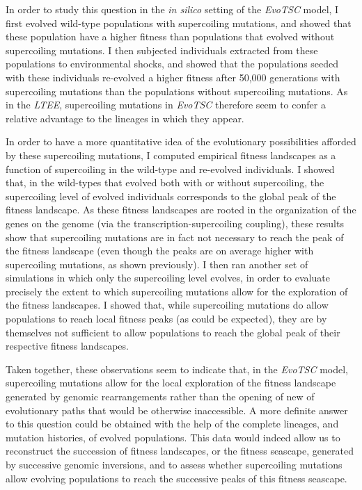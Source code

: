 In order to study this question in the \emph{in silico} setting of the \emph{EvoTSC} model, I first evolved wild-type populations with supercoiling mutations, and showed that these population have a higher fitness than populations that evolved without supercoiling mutations.
I then subjected individuals extracted from these populations to environmental shocks, and showed that the populations seeded with these individuals re-evolved a higher fitness after 50,000 generations with supercoiling mutations than the populations without supercoiling mutations.
As in the \emph{LTEE}, supercoiling mutations in \emph{EvoTSC} therefore seem to confer a relative advantage to the lineages in which they appear.

In order to have a more quantitative idea of the evolutionary possibilities afforded by these supercoiling mutations, I computed empirical fitness landscapes as a function of supercoiling in the wild-type and re-evolved individuals.
I showed that, in the wild-types that evolved both with or without supercoiling, the supercoiling level of evolved individuals corresponds to the global peak of the fitness landscape.
As these fitness landscapes are rooted in the organization of the genes on the genome (via the transcription-supercoiling coupling), these results show that supercoiling mutations are in fact not necessary to reach the peak of the fitness landscape (even though the peaks are on average higher with supercoiling mutations, as shown previously).
I then ran another set of simulations in which only the supercoiling level evolves, in order to evaluate precisely the extent to which supercoiling mutations allow for the exploration of the fitness landscapes.
I showed that, while supercoiling mutations do allow populations to reach local fitness peaks (as could be expected), they are by themselves not sufficient to allow populations to reach the global peak of their respective fitness landscapes.

Taken together, these observations seem to indicate that, in the \emph{EvoTSC} model, supercoiling mutations allow for the local exploration of the fitness landscape generated by genomic rearrangements rather than the opening of new of evolutionary paths that would be otherwise inaccessible.
A more definite answer to this question could be obtained with the help of the complete lineages, and mutation histories, of evolved populations.
This data would indeed allow us to reconstruct the succession of fitness landscapes, or the fitness seascape, generated by successive genomic inversions, and to assess whether supercoiling mutations allow evolving populations to reach the successive peaks of this fitness seascape.
